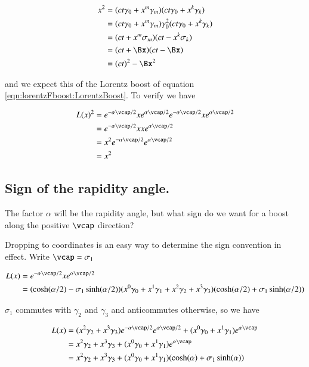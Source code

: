 \begin{align*}
x^2 
&= (ct \gamma_0 + x^m \gamma_m) (ct \gamma_0 + x^k \gamma_k) \\
&= (ct \gamma_0 + x^m \gamma_m) \gamma_0^2 (ct \gamma_0 + x^k \gamma_k) \\
&= (ct + x^m \sigma_m) (ct - x^k \sigma_k) \\
&= (ct + \Bx) (ct - \Bx) \\
&= (ct)^2 - \Bx^2
\end{align*}

and we expect this of the Lorentz boost of equation \ref{eqn:lorentzFboost:LorentzBoost}.  To verify we have

\begin{align*}
L(x)^2 
&=
e^{-\alpha \vcap/2}
x
e^{\alpha \vcap/2}
e^{-\alpha \vcap/2}
x
e^{\alpha \vcap/2} \\
&=
e^{-\alpha \vcap/2}
x
x
e^{\alpha \vcap/2} \\
&=
x^2
e^{-\alpha \vcap/2}
e^{\alpha \vcap/2} \\
&=
x^2
\end{align*}

\subsection{Sign of the rapidity angle. }

The factor $\alpha$ will be the rapidity angle, but what sign do we want for a boost along the positive $\vcap$ direction?

Dropping to coordinates is an easy way to determine the sign convention in effect.  Write $\vcap = \sigma_1$

\begin{align*}
L(x) &= 
e^{-\alpha \vcap/2}
x
e^{\alpha \vcap/2} \\
&=
(\cosh(\alpha/2) - \sigma_1 \sinh(\alpha/2))
(
x^0 \gamma_0
+x^1 \gamma_1
+x^2 \gamma_2
+x^3 \gamma_3
)
(\cosh(\alpha/2) + \sigma_1 \sinh(\alpha/2))
\end{align*}

$\sigma_1$ commutes with $\gamma_2$ and $\gamma_3$ and anticommutes otherwise, so we have

\begin{align*}
L(x) &= 
(
x^2 \gamma_2
+x^3 \gamma_3
) 
e^{-\alpha \vcap/2}
e^{\alpha \vcap/2}
+
(
x^0 \gamma_0
+x^1 \gamma_1
)
e^{\alpha \vcap} \\
&=
x^2 \gamma_2
+x^3 \gamma_3
+(
x^0 \gamma_0
+x^1 \gamma_1
)
e^{\alpha \vcap} \\
&=
x^2 \gamma_2
+x^3 \gamma_3
+(
x^0 \gamma_0
+x^1 \gamma_1
)
(\cosh(\alpha) + \sigma_1 \sinh(\alpha))
\end{align*}

